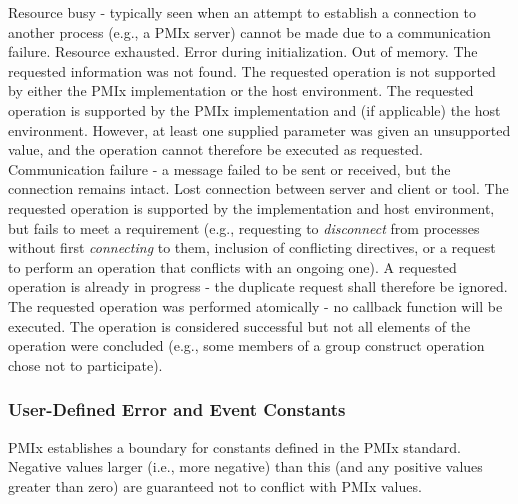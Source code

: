 \begin{constantdesc}
Resource busy - typically seen when an attempt to establish a connection
to another process (e.g., a \ac{PMIx} server) cannot be made due to a
communication failure.
%
Resource exhausted.
%
Error during initialization.
%
Out of memory.
%
The requested information was not found.
%
The requested operation is not supported by either the \ac{PMIx} implementation
or the host environment.
%
The requested operation is supported by the \ac{PMIx} implementation and (if applicable) the host environment. However, at least one supplied parameter was given an unsupported value, and the operation cannot therefore be executed as requested.
%
Communication failure - a message failed to be sent or received, but the
connection remains intact.
%
Lost connection between server and client or tool.
%
The requested operation is supported by the implementation and host environment, but fails to meet a requirement (e.g., requesting to \textit{disconnect} from processes without first \textit{connecting} to them, inclusion of conflicting directives, or a request to perform an operation that conflicts with an ongoing one).
%
A requested operation is already in progress - the duplicate request
shall therefore be ignored.
%
The requested operation was performed atomically - no callback function will be executed.
%
The operation is considered successful but not all elements of the operation were concluded (e.g., some members of a group construct operation chose not to participate).
%
\end{constantdesc}


\subsubsection{User-Defined Error and Event Constants}
\label{api:struct:usererrors}

\ac{PMIx} establishes a boundary for constants defined in the \ac{PMIx} standard. Negative values larger (i.e., more negative) than this (and any positive values greater than zero) are guaranteed not to conflict with \ac{PMIx} values.

